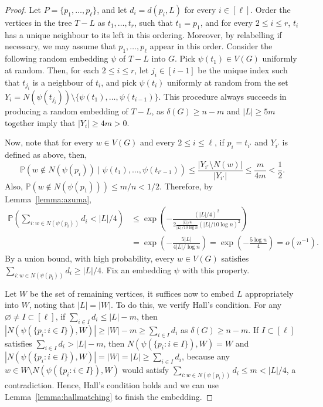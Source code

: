 \documentclass{article}
\theoremstyle{plain}
\theoremstyle{definition}
\numberwithin{equation}{section}
\begin{document}
\begin{proof}
Let $P=\{p_1,\ldots,p_\ell\}$, and let $d_i=d(p_i,L)$ for every $i\in[\ell]$. Order the vertices in the tree $T-L$ as $t_1,\ldots,t_r$, such that $t_1=p_1$, and for every $2\leq i\leq r$, $t_i$ has a unique neighbour to its left in this ordering. Moreover, by relabelling if necessary, we may assume that $p_1,\ldots,p_\ell$ appear in this order. Consider the following random embedding $\psi$ of $T-L$ into $G$. Pick $\psi(t_1)\in V(G)$ uniformly at random. Then, for each $2\leq i\leq r$, let $j_i\in[i-1]$ be the unique index such that $t_{j_i}$ is a neighbour of $t_i$, and pick $\psi(t_i)$ uniformly at random from the set $Y_i=N(\psi(t_{j_i}))\setminus\{\psi(t_1),\ldots,\psi(t_{i-1})\}$. This procedure always succeeds in producing a random embedding of $T-L$, as $\delta(G)\geq n-m$ and $|L|\geq5m$ together imply that $|Y_i|\geq4m>0$. 

Now, note that for every $w\in V(G)$ and every $2\leq i\leq\ell$, if $p_i=t_{i'}$ and $Y_{i'}$ is defined as above, then,
\[\mathbb{P}(w\not\in N(\psi(p_i))\mid\psi(t_1),\ldots,\psi(t_{i'-1}))\leq\frac{|Y_{i'}\setminus N(w)|}{|Y_{i'}|}\leq\frac{m}{4m}<\frac12.\]
Also, $\mathbb{P}(w\not\in N(\psi(p_1)))\leq m/n<1/2$. Therefore, by Lemma~\ref{lemma:azuma},
\begin{align*}
\mathbb{P}\left(\sum_{i:w\in N(\psi(p_i))}d_i<|L|/4\right)&\leq\exp\left(-\frac{(|L|/4)^2}{2\frac{|L|/4}{|L|/10\log n}(|L|/10\log n)^2}\right)\\
&=\exp\left(-\frac{5|L|}{4|L|/\log n}\right)=\exp\left(-\frac{5\log n}{4}\right)=o(n^{-1}).
\end{align*}
By a union bound, with high probability, every $w\in V(G)$ satisfies $\sum_{i:w\in N(\psi(p_i))}d_i\geq|L|/4$. Fix an embedding $\psi$ with this property.

Let $W$ be the set of remaining vertices, it suffices now to embed $L$ appropriately into $W$, noting that $|L|=|W|$. To do this, we verify Hall's condition. For any $\varnothing\not=I\subset[\ell]$, if $\sum_{i\in I}d_i\leq|L|-m$, then $|N(\psi(\{p_i:i\in I\}),W)|\geq|W|-m\geq\sum_{i\in I}d_i$ as $\delta(G)\geq n-m$. If $I\subset[\ell]$ satisfies $\sum_{i\in I}d_i>|L|-m$, then $N(\psi(\{p_i:i\in I\}),W)=W$ and $|N(\psi(\{p_i:i\in I\}),W)|=|W|=|L|\geq\sum_{i\in I}d_i$, because any $w\in W\setminus N(\psi(\{p_i:i\in I\}),W)$ would satisfy $\sum_{i:w\in N(\psi(p_i))}d_i\leq m<|L|/4$, a contradiction. Hence, Hall's condition holds and we can use Lemma~\ref{lemma:hallmatching} to finish the embedding. 
\end{proof}
\end{document}
